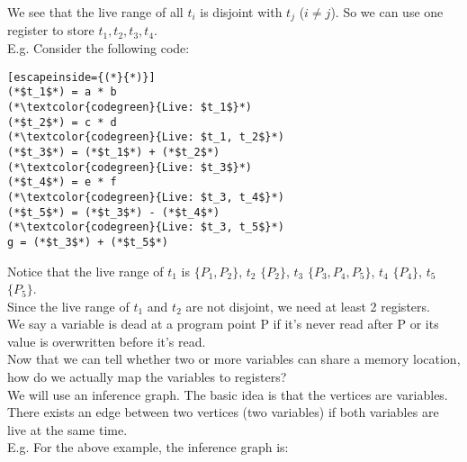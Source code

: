\documentclass[12pt, letterpaper]{article}
\begin{document}
We see that the live range of all \(t_i\) is disjoint with \(t_j\) (\(i \neq j\)). So we can use one register to store \(t_1, t_2, t_3, t_4\).\\

E.g. Consider the following code:
\begin{lstlisting}[escapeinside={(*}{*)}]
(*$t_1$*) = a * b
(*\textcolor{codegreen}{Live: $t_1$}*)
(*$t_2$*) = c * d
(*\textcolor{codegreen}{Live: $t_1, t_2$}*)
(*$t_3$*) = (*$t_1$*) + (*$t_2$*)
(*\textcolor{codegreen}{Live: $t_3$}*)
(*$t_4$*) = e * f
(*\textcolor{codegreen}{Live: $t_3, t_4$}*)
(*$t_5$*) = (*$t_3$*) - (*$t_4$*)
(*\textcolor{codegreen}{Live: $t_3, t_5$}*)
g = (*$t_3$*) + (*$t_5$*)
\end{lstlisting}

Notice that the live range of \(t_1\) is \(\{P_1, P_2\}\), \(t_2\) \(\{P_2\}\), \(t_3\) \(\{P_3, P_4, P_5\}\), \(t_4\) \(\{P_4\}\), \(t_5\) \(\{P_5\}\).\\

Since the live range of \(t_1\) and \(t_2\) are not disjoint, we need at least 2 registers.\\

We say a variable is dead at a program point P if it's never read after P or its value is overwritten before it's read.\\

Now that we can tell whether two or more variables can share a memory location, how do we actually map the variables to registers?\\

We will use an inference graph. The basic idea is that the vertices are variables. There exists an edge between two vertices (two variables) if both variables are live at the same time.\\

E.g. For the above example, the inference graph is:
\begin{center}
\end{center}
\end{document}
